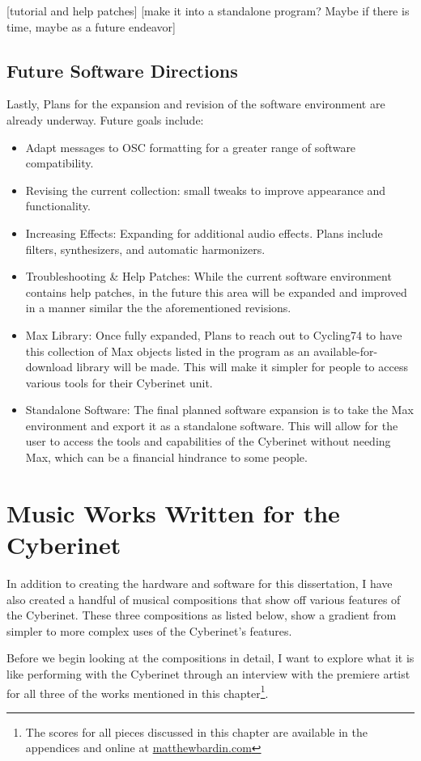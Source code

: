 [tutorial and help patches]
[make it into a standalone program? Maybe if there is time, maybe as a future endeavor]


\section{Future Software Directions}
Lastly, Plans for the expansion and revision of the software environment are already underway. Future goals include:
\begin{itemize}
    \item Adapt messages to OSC formatting for a greater range of software compatibility.
    \item Revising the current collection: small tweaks to improve appearance and functionality.
    \item Increasing Effects: Expanding for additional audio effects. Plans include filters, synthesizers, and automatic harmonizers.
    \item Troubleshooting \& Help Patches: While the current software environment contains help patches, in the future this area will be expanded and improved in a manner similar the the aforementioned revisions.
    \item Max Library: Once fully expanded, Plans to reach out to Cycling74 to have this collection of Max objects listed in the program as an available-for-download library will be made. This will make it simpler for people to access various tools for their Cyberinet unit.
    \item Standalone Software: The final planned software expansion is to take the Max environment and export it as a standalone software. This will allow for the user to access the tools and capabilities of the Cyberinet without needing Max, which can be a financial hindrance to some people.
\end{itemize}




\chapter{Music Works Written for the Cyberinet}

In addition to creating the hardware and software for this dissertation, I have also created a handful of musical compositions that show off various features of the Cyberinet. These three compositions as listed below, show a gradient from simpler to more complex uses of the Cyberinet’s features.

Before we begin looking at the compositions in detail, I want to explore what it is like performing with the Cyberinet through an interview with the premiere artist for all three of the works mentioned in this chapter\footnote{The scores for all pieces discussed in this chapter are available in the appendices and online at \url{matthewbardin.com}}.

